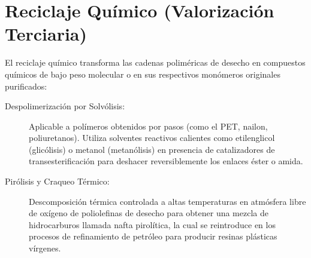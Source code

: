 \section{Reciclaje Químico (Valorización Terciaria)}

El reciclaje químico transforma las cadenas poliméricas de desecho en compuestos químicos de bajo peso molecular o en sus respectivos monómeros originales purificados:

\begin{description}
    \item[Despolimerización por Solvólisis:] Aplicable a polímeros obtenidos por pasos (como el PET, nailon, poliuretanos). Utiliza solventes reactivos calientes como etilenglicol (glicólisis) o metanol (metanólisis) en presencia de catalizadores de transesterificación para deshacer reversiblemente los enlaces éster o amida.
    \item[Pirólisis y Craqueo Térmico:] Descomposición térmica controlada a altas temperaturas en atmósfera libre de oxígeno de poliolefinas de desecho para obtener una mezcla de hidrocarburos llamada nafta pirolítica, la cual se reintroduce en los procesos de refinamiento de petróleo para producir resinas plásticas vírgenes.
\end{description}
